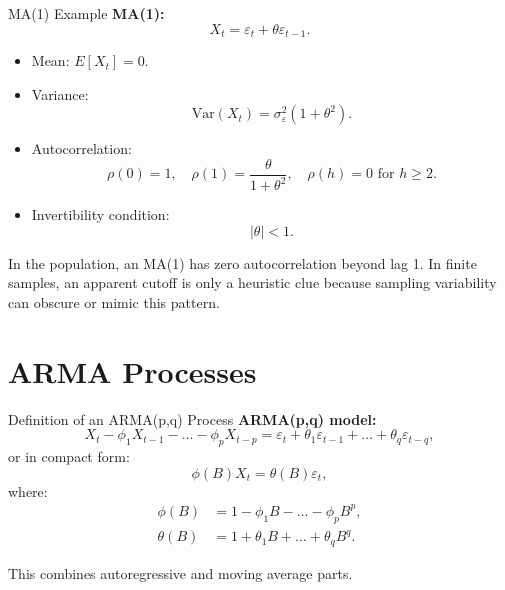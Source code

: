 \documentclass{beamer}
\begin{document}
\begin{frame}{MA(1) Example}
  \textbf{MA(1):}
  \[
    X_t = \varepsilon_t + \theta \varepsilon_{t-1}.
  \]

  \vspace{0.2cm}
  \begin{itemize}
    \item Mean: $E[X_t] = 0$.
    \item Variance:
      \[
        \mathrm{Var}(X_t) = \sigma_\varepsilon^2 (1 + \theta^2).
      \]
    \item Autocorrelation:
      \[
        \rho(0) = 1, \quad
        \rho(1) = \frac{\theta}{1 + \theta^2}, \quad
        \rho(h) = 0 \text{ for } h \ge 2.
      \]
    \item Invertibility condition:
      \[
        |\theta| < 1.
      \]
  \end{itemize}

  \vspace{0.2cm}
  In the population, an MA(1) has zero autocorrelation beyond lag 1. In finite samples, an apparent cutoff is only a heuristic clue because sampling variability can obscure or mimic this pattern.
\end{frame}

\section{ARMA Processes}

\begin{frame}{Definition of an ARMA(p,q) Process}
  \textbf{ARMA(p,q) model:}
  \[
    X_t - \phi_1 X_{t-1} - \dots - \phi_p X_{t-p}
    = \varepsilon_t + \theta_1 \varepsilon_{t-1} + \dots + \theta_q \varepsilon_{t-q},
  \]
  or in compact form:
  \[
    \phi(B) X_t = \theta(B) \varepsilon_t,
  \]
  where:
  \begin{align*}
    \phi(B) &= 1 - \phi_1 B - \dots - \phi_p B^p, \\
    \theta(B) &= 1 + \theta_1 B + \dots + \theta_q B^q.
  \end{align*}

  \vspace{0.2cm}
  This combines autoregressive and moving average parts.
\end{frame}
\end{document}
